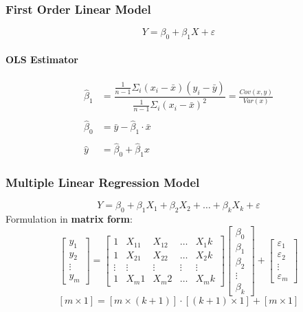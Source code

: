 \subsubsection{First Order Linear Model}

$$Y = \beta_0 + \beta_1 X + \varepsilon$$

\paragraph{OLS Estimator}

\begin{align*}
	\hat{\beta}_1 &= \dfrac{\frac{1}{n-1}\Sigma_i (x_i - \bar{x})(y_i - \bar{y})}{\frac{1}{n-1}\Sigma_i (x_i - \bar{x})^2} = \frac{Cov(x,y)}{Var(x)} \\ \ \\
	\hat{\beta}_0 &= \bar{y} - \hat{\beta}_1\cdot \bar{x} \\ \ \\
	\hat{y} &= \hat{\beta}_0 + \hat{\beta}_1 x
\end{align*}	

\subsubsection{Multiple Linear Regression Model}
$$Y = \beta_0 + \beta_1 X_1 + \beta_2 X_2 + \dots + \beta_k X_k + \varepsilon$$
Formulation in \textbf{matrix form}:
$$\begin{bmatrix}
y_1 \\ y_2 \\ \vdots \\ y_m
\end{bmatrix} = \begin{bmatrix}
1 & X_11 &X_12 &\dots &X_1k \\
1 & X_21 &X_22 &\dots &X_2k \\
\vdots & \vdots &\vdots &\vdots &\vdots \\
1 & X_m1 &X_m2 &\dots &X_mk
\end{bmatrix} \begin{bmatrix}
\beta_0 \\ \beta_1 \\ \beta_2 \\ \vdots \\ \beta_k
\end{bmatrix} + \begin{bmatrix}
\varepsilon_1 \\ \varepsilon_2 \\ \vdots \\ \varepsilon_m
\end{bmatrix}$$
$$[m \times 1] = [m \times (k+1)] \cdot [(k+1) \times 1] + [m \times 1]$$

